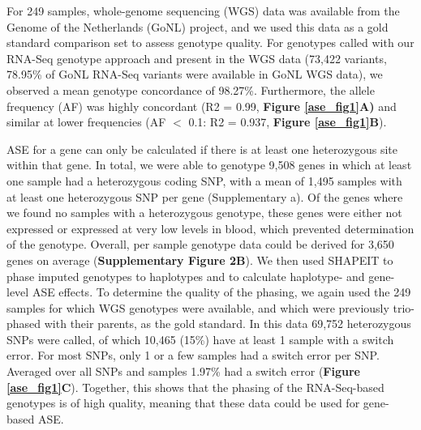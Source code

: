 For 249 samples, whole-genome sequencing (WGS) data was available from the Genome of the Netherlands (GoNL) project\cite{boomsmaGenomeNetherlandsDesign2014}, and we used this data as a gold standard comparison set to assess genotype quality. For genotypes called with our RNA-Seq genotype approach and present in the WGS data (73,422 variants, 78.95\% of GoNL RNA-Seq variants were available in GoNL WGS data), we observed a mean genotype concordance of 98.27\%. Furthermore, the allele frequency (AF) was highly concordant (R2 = 0.99, \textbf{Figure \ref{ase_fig1}A)} and similar at lower frequencies (AF $<$ 0.1: R2 = 0.937, \textbf{Figure \ref{ase_fig1}B}). 

ASE for a gene can only be calculated if there is at least one heterozygous site within that gene. In total, we were able to genotype 9,508 genes in which at least one sample had a heterozygous coding SNP, with a mean of 1,495 samples with at least one heterozygous SNP per gene (Supplementary a). Of the genes where we found no samples with a heterozygous genotype, these genes were either not expressed or expressed at very low levels in blood, which prevented determination of the genotype. Overall, per sample genotype data could be derived for 3,650 genes on average (\textbf{Supplementary Figure 2B}). We then used SHAPEIT\cite{oconnellGeneralApproachHaplotype2014} to phase imputed genotypes to haplotypes and to calculate haplotype- and gene-level ASE effects. To determine the quality of the phasing, we again used the 249 samples for which WGS genotypes were available, and which were previously trio-phased with their parents, as the gold standard. In this data 69,752 heterozygous SNPs were called, of which 10,465 (15\%) have at least 1 sample with a switch error. For most SNPs, only 1 or a few samples had a switch error per SNP. Averaged over all SNPs and samples 1.97\% had a switch error (\textbf{Figure \ref{ase_fig1}C}). Together, this shows that the phasing of the RNA-Seq-based genotypes is of high quality, meaning that these data could be used for gene-based ASE.

